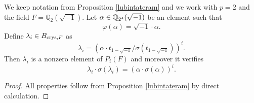 \begin{corollary}
\notready\label{brinonwild}
We keep notation from Proposition  \ref{lubintateram} and we work  with $p=2$ and the field  $F=\mathbb{Q}_2(\sqrt{-1})$.  Let $\alpha \in \mathbb{Q}_{2^4}(\sqrt{-1})$ be an element  such that
\[\varphi(\alpha) =  \sqrt{-1} \cdot \alpha.\]
Define $\lambda_i \in B_{\textnormal{crys},F}$ as
\[\lambda_i = (\alpha \cdot t_{1-\sqrt{-1}} /\sigma(t_{1-\sqrt{-1}}))^i .\]
Then $\lambda_i$ is a nonzero element of  $P_{i}(F) $ and  moreover it verifies
\[\lambda_i \cdot\sigma(\lambda_i) = (\alpha  \cdot \sigma(\alpha) )^i.\]
\end{corollary}
\begin{proof}
All properties follow from Proposition \ref{lubintateram}  by direct calculation.
\end{proof}



